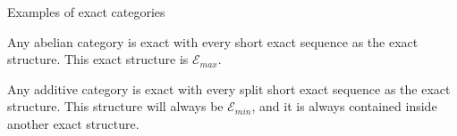 \documentclass{beamer}
\begin{document}
            \begin{frame}{Examples of exact categories}
                \begin{example}
                    Any abelian category is exact with every short exact sequence as the exact structure. This exact structure is $\mathcal{E}_{max}$.
                \end{example}
            
                \begin{example}
                    Any additive category is exact with every split short exact sequence as the exact structure. This structure will always be $\mathcal{E}_{min}$, and it is always contained inside another exact structure.
                \end{example}
            \end{frame}
\end{document}

